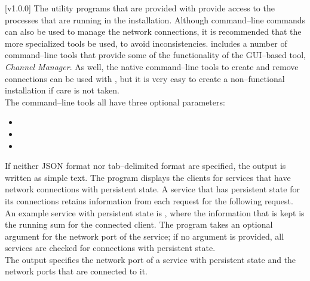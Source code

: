 [v1.0.0]
The utility programs that are provided with \mplusm{} provide access to the processes that
are running in the \mplusm{} installation.
Although command--line \yarp{} commands can also be used to manage the network
connections, it is recommended that the more specialized \mplusm{} tools be used, to avoid
inconsistencies.
\mplusm{} includes a number of command--line tools that provide some of the functionality
of the GUI--based tool, \emph{Channel Manager}.
As well, the native \yarp{} command--line tools to create and remove connections can be
used with \mplusm{}, but it is very easy to create a non--functional installation if care
is not taken.\\

The command--line tools all have three optional parameters:
\begin{itemize}
\item {}
\item {}
\item {}
\end{itemize}
If neither JSON format nor tab--delimited format are specified, the output is written as
simple text.
The program  displays the clients for services that have
\yarp{} network connections with persistent state.
A service that has persistent state for its connections retains information from each
request for the following request.
An example service with persistent state is
, where the information that is kept is the
running sum for the connected client.
The program takes an optional argument for the \yarp{} network port of the service; if no
argument is provided, all services are checked for connections with persistent state.\\

The output specifies the \yarp{} network port of a service with persistent state and the
\yarp{} network ports that are connected to it.\\

